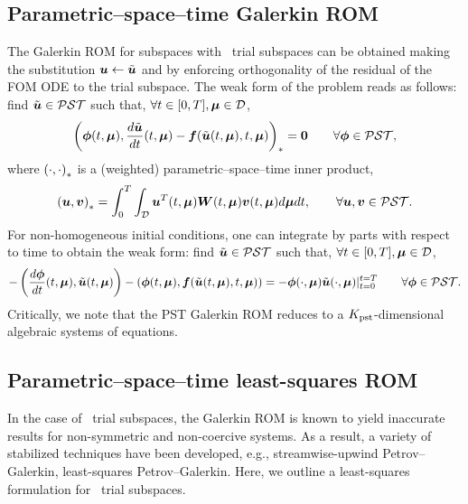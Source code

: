 \documentclass[3p,computermodern,10pt]{elsarticle}
\begin{document}
\subsection{Parametric--space--time Galerkin ROM}
The Galerkin ROM for subspaces with \parametricSpaceTimeAcronym\ trial subspaces can be obtained making the substitution $\boldsymbol u \leftarrow \tilde{\boldsymbol u}$ and by enforcing orthogonality of the residual of the FOM ODE to the trial subspace. The weak form of the problem reads as follows: find $\tilde{\boldsymbol u} \in \mathcal{PST}$ such that, $\forall t \in [0,T], \boldsymbol \mu \in \mathcal{D}$,
$$\left(  \boldsymbol \phi(t,\boldsymbol \mu) ,  \frac{d \tilde{\boldsymbol u}}{dt}(t,\boldsymbol \mu) - \boldsymbol f(\tilde{\boldsymbol u}(t,\boldsymbol \mu),t,\boldsymbol \mu)  \right)_{*} = \boldsymbol 0 \qquad \forall \boldsymbol \phi \in  \mathcal{PST} ,$$
where $\left( \cdot, \cdot \right)_{*}$ is a (weighted) parametric--space--time inner product, 
$$\left( \boldsymbol u,  \boldsymbol v \right)_{*} = \int_0^T \int _{\mathcal{D}} \boldsymbol u^T(t,\boldsymbol \mu) \boldsymbol W (t,\boldsymbol \mu)\boldsymbol v(t,\boldsymbol \mu)  d \boldsymbol \mu dt, \qquad \forall \boldsymbol u, \boldsymbol v \in \mathcal{PST}.$$ 
For non-homogeneous initial conditions, one can integrate by parts with respect to time to obtain the weak form: find $\tilde{\boldsymbol u} \in \mathcal{PST}$ such that, $\forall t \in [0,T], \boldsymbol \mu \in \mathcal{D}$,
$$-\left( \frac{d\boldsymbol \phi}{dt}(t,\boldsymbol \mu) ,\tilde{\boldsymbol u}(t,\boldsymbol \mu) \right) - \left(\boldsymbol \phi(t,\boldsymbol \mu),  \boldsymbol f(\tilde{\boldsymbol u}(t,\boldsymbol \mu),t,\boldsymbol \mu) \right)  = -\boldsymbol \phi(\cdot,\boldsymbol \mu) \tilde{\boldsymbol u}(\cdot,\boldsymbol \mu) |_{t=0}^{t=T}\qquad \forall \boldsymbol \phi \in  \mathcal{PST}.$$
Critically, we note that the PST Galerkin ROM reduces to a $K_{\text{pst}}$-dimensional algebraic systems of equations.  

\subsection{Parametric--space--time least-squares ROM}
In the case of \spatialAcronym\ trial subspaces, the Galerkin ROM is known to yield inaccurate results for non-symmetric and non-coercive systems. As a result, a variety of stabilized techniques have been developed, e.g., streamwise-upwind Petrov--Galerkin, least-squares Petrov--Galerkin. Here, we outline a least-squares formulation for \parametricSpaceTimeAcronym\ trial subspaces. 
\end{document}

